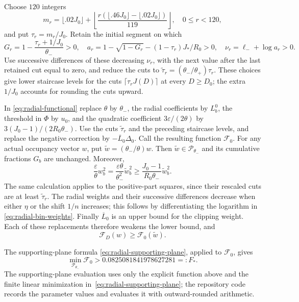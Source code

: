 Choose $120$ integers
\[
 m_r=\lfloor.02J_0\rfloor+
 \left\lfloor\frac{r(\lfloor.46J_0\rfloor-\lfloor.02J_0\rfloor)}{119}
                                                      \right\rfloor,
 \quad 0\leq r<120,
\]
and put $\tau_r=m_r/J_0$. Retain the initial segment on which
\[
 G_r=1-\frac{\tau_r+1/J_0}{\theta_-}>0,
 \quad a_r=1-\sqrt{1-G_r}-(1-\tau_r)J_*/R_0>0,
 \quad\nu_r=\ell_-+\log a_r>0.
\]
Use successive differences of these decreasing $\nu_r$, with the next
value after the last retained cut equal to zero, and reduce the cuts
to $\widetilde\tau_r=(\theta_-/\theta_+)\tau_r$.
These choices give lower staircase levels for the cuts
$\lceil\tau_rJ(D)\rceil$ at every $D\geq D_0$; the extra $1/J_0$
accounts for rounding the cuts upward.

In \eqref{eq:radial-functional} replace $\theta$ by $\theta_-$,
the radial coefficients by $L_b^0$, the threshold in $\Phi$ by $u_0$,
and the quadratic coefficient $3\varepsilon/(2\theta)$ by
$3(J_0-1)/(2R_0\theta_-)$. Use the cuts
$\widetilde\tau_r$ and the preceding staircase levels, and replace
the negative correction by $-\overline L_0\Delta_0$.
Call the resulting function $\mathcal F_0$.
For any actual occupancy vector $w$, put
$\widetilde w=(\theta_-/\theta)w$. Then
$\widetilde w\in\mathcal P_{\theta_-}$ and its cumulative fractions
$G_b$ are unchanged. Moreover,
\[
 \frac{\varepsilon}{\theta}w_b^2
 =\frac{\varepsilon\theta}{\theta_-^2}\widetilde w_b^2
 \geq\frac{J_0-1}{R_0\theta_-}\widetilde w_b^2.
\]
The same calculation applies to the positive-part squares, since their
rescaled cuts are at least $\widetilde\tau_r$.
The radial weights and their successive differences decrease when either
$\eta$ or the shift $1/n$ increases; this follows by differentiating
the logarithm in \eqref{eq:radial-bin-weights}.
Finally $\overline L_0$ is an upper bound for the clipping weight.
Each of these replacements therefore weakens the lower bound, and
\begin{equation}\label{eq:global-functional-comparison}
 \mathcal F_D(w)\geq\mathcal F_0(\widetilde w).
\end{equation}

The supporting-plane formula \eqref{eq:radial-supporting-plane}, applied
to $\mathcal F_0$, gives
\begin{equation}\label{eq:global-convex-value}
 \min_{\mathcal P_{\theta_-}}\mathcal F_0
                          >0.0825081841978627281=:F_*.
\end{equation}
The supporting-plane evaluation uses only the explicit function above and
the finite linear minimization in~\eqref{eq:radial-supporting-plane}; the
repository code records the parameter values and evaluates it with
outward-rounded arithmetic.

